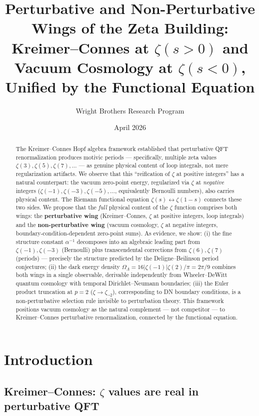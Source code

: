 \documentclass[11pt,a4paper]{article}
\title{Perturbative and Non-Perturbative Wings of the Zeta Building:\\
Kreimer--Connes at $\zeta(s>0)$ and Vacuum Cosmology at $\zeta(s<0)$,\\
Unified by the Functional Equation}
\author{Wright Brothers Research Program}
\date{April 2026}
\begin{document}
\maketitle

\begin{abstract}
The Kreimer--Connes Hopf algebra framework established that
perturbative QFT renormalization produces motivic periods ---
specifically, multiple zeta values $\zeta(3), \zeta(5), \zeta(7),
\ldots$ --- as genuine physical content of loop integrals, not mere
regularization artifacts. We observe that this ``reification of
$\zeta$ at positive integers'' has a natural counterpart: the
vacuum zero-point energy, regularized via $\zeta$ at
\emph{negative} integers ($\zeta(-1), \zeta(-3), \zeta(-5), \ldots$,
equivalently Bernoulli numbers), also carries physical content.
The Riemann functional equation $\zeta(s) \leftrightarrow \zeta(1-s)$
connects these two sides. We propose that the \emph{full}
physical content of the $\zeta$ function comprises both wings:
the \textbf{perturbative wing} (Kreimer--Connes, $\zeta$ at
positive integers, loop integrals) and the
\textbf{non-perturbative wing} (vacuum cosmology, $\zeta$ at
negative integers, boundary-condition-dependent zero-point sums).
As evidence, we show: (i) the fine structure constant $\alpha^{-1}$
decomposes into an algebraic leading part from $\zeta(-1), \zeta(-3)$
(Bernoulli) plus transcendental corrections from $\zeta(6), \zeta(7)$
(periods) --- precisely the structure predicted by the
Deligne--Beilinson period conjectures; (ii) the dark energy density
$\Omega_\Lambda = 16|\zeta(-1)|\zeta(2)/\pi = 2\pi/9$ combines
both wings in a single observable, derivable independently from
Wheeler--DeWitt quantum cosmology with temporal Dirichlet--Neumann
boundaries; (iii) the Euler product truncation at $p=2$
($\zeta \to \zeta_{\neg 2}$), corresponding to DN boundary
conditions, is a non-perturbative selection rule invisible to
perturbation theory. This framework positions vacuum cosmology
as the natural complement --- not competitor --- to Kreimer--Connes
perturbative renormalization, connected by the functional equation.
\end{abstract}

\section{Introduction}

\subsection{Kreimer--Connes: $\zeta$ values are real in perturbative QFT}
\end{document}
